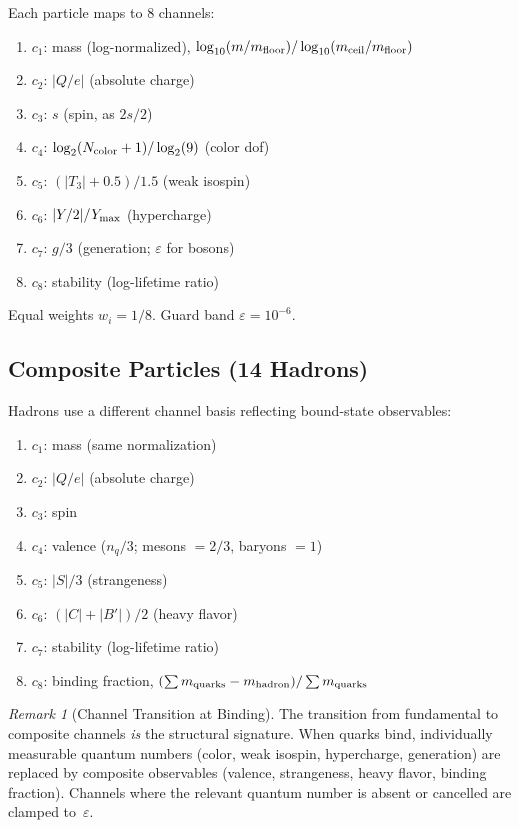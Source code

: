 \documentclass[11pt,a4paper]{article}
\theoremstyle{plain}
\theoremstyle{definition}
\theoremstyle{remark}
\newtheorem{remark}{Remark}
\newcommand{\eps}{\varepsilon}
\begin{document}
Each particle maps to 8 channels:
\begin{enumerate}
\item $c_1$: mass (log-normalized),
  $\log_{10}(m/m_{\rm floor}) / \log_{10}(m_{\rm ceil}/m_{\rm floor})$
\item $c_2$: $|Q/e|$ (absolute charge)
\item $c_3$: $s$ (spin, as $2s/2$)
\item $c_4$: $\log_2(N_{\rm color}+1) / \log_2(9)$ (color dof)
\item $c_5$: $(|T_3|+0.5)/1.5$ (weak isospin)
\item $c_6$: $|Y/2|/Y_{\rm max}$ (hypercharge)
\item $c_7$: $g/3$ (generation; $\eps$ for bosons)
\item $c_8$: stability (log-lifetime ratio)
\end{enumerate}
Equal weights $w_i = 1/8$.  Guard band $\eps = 10^{-6}$.

\subsection{Composite Particles (14 Hadrons)}

Hadrons use a different channel basis reflecting bound-state
observables:
\begin{enumerate}
\item $c_1$: mass (same normalization)
\item $c_2$: $|Q/e|$ (absolute charge)
\item $c_3$: spin
\item $c_4$: valence ($n_q/3$; mesons $= 2/3$, baryons $= 1$)
\item $c_5$: $|S|/3$ (strangeness)
\item $c_6$: $(|C|+|B'|)/2$ (heavy flavor)
\item $c_7$: stability (log-lifetime ratio)
\item $c_8$: binding fraction,
  $(\sum m_{\rm quarks} - m_{\rm hadron}) / \sum m_{\rm quarks}$
\end{enumerate}

\begin{remark}[Channel Transition at Binding]\label{rem:transition}
The transition from fundamental to composite channels \emph{is}
the structural signature.  When quarks bind, individually
measurable quantum numbers (color, weak isospin, hypercharge,
generation) are replaced by composite observables (valence,
strangeness, heavy flavor, binding fraction).  Channels where the
relevant quantum number is absent or cancelled are clamped
to~$\eps$.
\end{remark}
\end{document}
